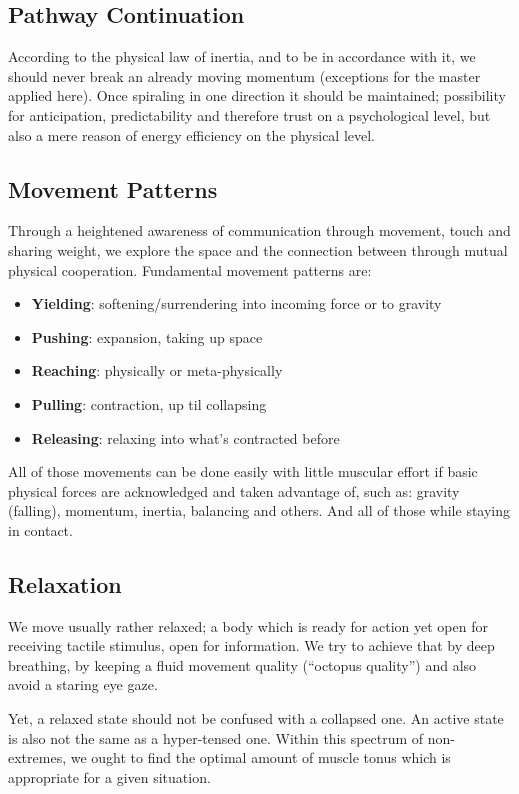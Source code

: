 \subsection{Pathway Continuation}\label{subsec:pathway-continuation}

According to the physical law of inertia, and to be in accordance with it, we should never break an already moving momentum (exceptions for the master applied here).
Once spiraling in one direction it should be maintained; possibility for anticipation, predictability and therefore trust on a psychological level, but also a mere reason of energy efficiency on the physical level.

\subsection{Movement Patterns}\label{subsec:movement-patterns}

Through a heightened awareness of communication through movement, touch and sharing weight, we explore the space and the connection between through mutual physical cooperation.
Fundamental movement patterns are:

\begin{itemize}
    \item \textbf{Yielding}: softening/surrendering into incoming force or to gravity
    \item \textbf{Pushing}: expansion, taking up space
    \item \textbf{Reaching}: physically or meta-physically
    \item \textbf{Pulling}: contraction, up til collapsing
    \item \textbf{Releasing}: relaxing into what's contracted before
\end{itemize}

All of those movements can be done easily with little muscular effort if basic physical forces are acknowledged and taken advantage of, such as: gravity (falling), momentum, inertia, balancing and others.
And all of those while staying in contact.

\subsection{Relaxation}\label{subsec:relaxation}

We move usually rather relaxed; a body which is ready for action yet open for receiving tactile stimulus, open for information.
We try to achieve that by deep breathing, by keeping a fluid movement quality (``octopus quality'') and also avoid a staring eye gaze.

Yet, a relaxed state should not be confused with a collapsed one.
An active state is also not the same as a hyper-tensed one.
Within this spectrum of non-extremes, we ought to find the optimal amount of muscle tonus which is appropriate for a given situation.
